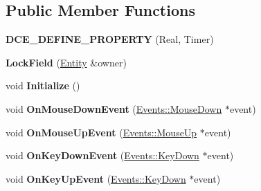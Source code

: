 \subsection*{Public Member Functions}
\begin{DoxyCompactItemize}
\item 
\hypertarget{classDCEngine_1_1Components_1_1LockField_ac87ff1f94f0cddbdfb28bfec8b496199}{{\bfseries D\-C\-E\-\_\-\-D\-E\-F\-I\-N\-E\-\_\-\-P\-R\-O\-P\-E\-R\-T\-Y} (Real, Timer)}\label{classDCEngine_1_1Components_1_1LockField_ac87ff1f94f0cddbdfb28bfec8b496199}

\item 
\hypertarget{classDCEngine_1_1Components_1_1LockField_a42428589d58b3a0925212dac9d97dd1d}{{\bfseries Lock\-Field} (\hyperlink{classDCEngine_1_1Entity}{Entity} \&owner)}\label{classDCEngine_1_1Components_1_1LockField_a42428589d58b3a0925212dac9d97dd1d}

\item 
\hypertarget{classDCEngine_1_1Components_1_1LockField_a15000593af1694dd610bdcfb40b6c23e}{void {\bfseries Initialize} ()}\label{classDCEngine_1_1Components_1_1LockField_a15000593af1694dd610bdcfb40b6c23e}

\item 
\hypertarget{classDCEngine_1_1Components_1_1LockField_a03f7d56ec71f7ff665fc2e09eb31c199}{void {\bfseries On\-Mouse\-Down\-Event} (\hyperlink{classDCEngine_1_1Events_1_1MouseDown}{Events\-::\-Mouse\-Down} $\ast$event)}\label{classDCEngine_1_1Components_1_1LockField_a03f7d56ec71f7ff665fc2e09eb31c199}

\item 
\hypertarget{classDCEngine_1_1Components_1_1LockField_aaab390582439dffa69d80925fa90a3fe}{void {\bfseries On\-Mouse\-Up\-Event} (\hyperlink{classDCEngine_1_1Events_1_1MouseUp}{Events\-::\-Mouse\-Up} $\ast$event)}\label{classDCEngine_1_1Components_1_1LockField_aaab390582439dffa69d80925fa90a3fe}

\item 
\hypertarget{classDCEngine_1_1Components_1_1LockField_a3ecf0bcf78fe9ea494c6d0c2fc2950ce}{void {\bfseries On\-Key\-Down\-Event} (\hyperlink{classDCEngine_1_1Events_1_1KeyDown}{Events\-::\-Key\-Down} $\ast$event)}\label{classDCEngine_1_1Components_1_1LockField_a3ecf0bcf78fe9ea494c6d0c2fc2950ce}

\item 
\hypertarget{classDCEngine_1_1Components_1_1LockField_a4ba6c03895b45396440d913f778b7386}{void {\bfseries On\-Key\-Up\-Event} (\hyperlink{classDCEngine_1_1Events_1_1KeyDown}{Events\-::\-Key\-Down} $\ast$event)}\label{classDCEngine_1_1Components_1_1LockField_a4ba6c03895b45396440d913f778b7386}


\end{DoxyCompactItemize}
